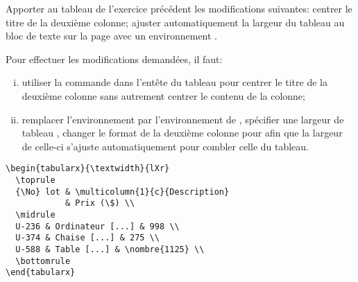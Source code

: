 \begin{exercice}
  Apporter au tableau de l'exercice précédent les modifications
  suivantes: centrer le titre de la deuxième colonne; ajuster
  automatiquement la largeur du tableau au bloc de texte sur la page
  avec un environnement .
  \begin{sol}
    Pour effectuer les modifications demandées, il faut:
    \begin{enumerate}[i)]
    \item utiliser la commande \cmd{\multicolumn} dans l'entête du
      tableau pour centrer le titre de la deuxième colonne sans
      autrement centrer le contenu de la colonne;
    \item remplacer l'environnement  par l'environnement
       de , spécifier une largeur de
      tableau , changer le format de la deuxième colonne
      pour  afin que la largeur de celle-ci s'ajuste
      automatiquement pour combler celle du tableau.
    \end{enumerate}
\begin{lstlisting}
\begin{tabularx}{\textwidth}{lXr}
  \toprule
  {\No} lot & \multicolumn{1}{c}{Description}
            & Prix (\$) \\
  \midrule
  U-236 & Ordinateur [...] & 998 \\
  U-374 & Chaise [...] & 275 \\
  U-588 & Table [...] & \nombre{1125} \\
  \bottomrule
\end{tabularx}
\end{lstlisting}
  \end{sol}
\end{exercice}

